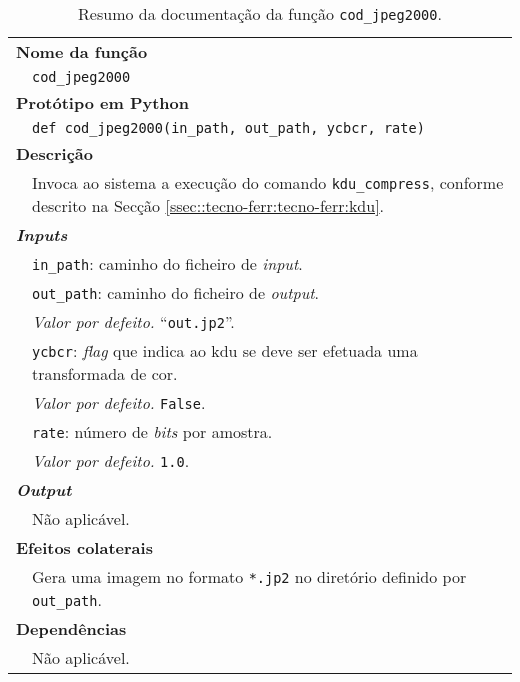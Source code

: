 \begin{table}[!htbp]
    \centering
    \caption{Resumo da documentação da função \texttt{cod\_jpeg2000}.}
    \label{tab:cod_jpeg2000}
    \begin{tabular}{p{1cm} p{10cm}}
        \hline
        \multicolumn{2}{l}{\bfseries Nome da função}\\
         & \verb|cod_jpeg2000|\\
        \hline
        \multicolumn{2}{l}{\bfseries Protótipo em Python}\\
         & \texttt{def cod_jpeg2000(in_path, out_path, ycbcr, rate)} \\
        \hline\multicolumn{2}{l}{\bfseries Descrição}\\
         & Invoca ao sistema a execução do comando \verb|kdu_compress|, conforme descrito na Secção \ref{ssec::tecno-ferr:tecno-ferr:kdu}. \\
        \hline\multicolumn{2}{l}{\bfseries \textit{Inputs}}\\
         & \verb|in_path|: caminho do ficheiro de \textit{input}. \\
         & \verb|out_path|: caminho do ficheiro de \textit{output}. \\
         & \hspace{1cm} \textit{Valor por defeito.} ``\verb|out.jp2|''.\\
         & \verb|ycbcr|: \textit{flag} que indica ao \ac{kdu} se deve ser efetuada uma transformada de cor. \\
         & \hspace{1cm} \textit{Valor por defeito.} \verb|False|.\\
         & \verb|rate|: número de \textit{bits} por amostra. \\
         & \hspace{1cm} \textit{Valor por defeito.} \verb|1.0|.\\
        \hline\multicolumn{2}{l}{\bfseries \textit{Output}}\\
         & Não aplicável. \\
        \hline\multicolumn{2}{l}{\bfseries Efeitos colaterais}\\
         & Gera uma imagem no formato \verb|*.jp2| no diretório definido por \verb|out_path|. \\
        \hline\multicolumn{2}{l}{\bfseries Dependências}\\
         & Não aplicável. \\
        \hline
    \end{tabular}
\end{table}

